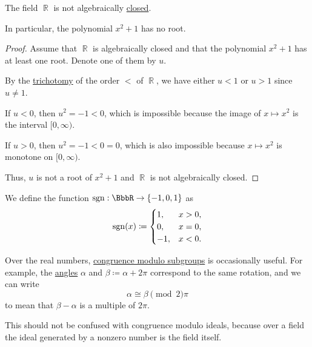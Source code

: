 \begin{proposition}\label{thm:reals_not_algebraically_closed}
  The field \( \BbbR \) is not algebraically \hyperref[def:algebraically_closed_field]{closed}.

  In particular, the polynomial \( x^2 + 1 \) has no root.
\end{proposition}
\begin{proof}
  Assume that \( \BbbR \) is algebraically closed and that the polynomial \( x^2 + 1 \) has at least one root. Denote one of them by \( u \).

  By the \hyperref[def:binary_relation/trichotomic]{trichotomy} of the order \( < \) of \( \BbbR \), we have either \( u < 1 \) or \( u > 1 \) since \( u \neq 1 \).

  If \( u < 0 \), then \( u^2 = -1 < 0 \), which is impossible because the image of \( x \mapsto x^2 \) is the interval \( [0, \infty) \).

  If \( u > 0 \), then \( u^2 = -1 < 0 = 0 \), which is also impossible because \( x \mapsto x^2 \) is monotone on \( [0, \infty) \).

  Thus, \( u \) is not a root of \( x^2 + 1 \) and \( \BbbR \) is not algebraically closed.
\end{proof}

\begin{definition}\label{def:signum}
  We define the  function \( \sgn: \BbbR \to \{ -1, 0, 1 \} \) as
  \begin{equation*}
    \operatorname{sgn}(x) \coloneqq \begin{cases}
      1,  & x > 0, \\
      0,  & x = 0, \\
      -1, & x < 0.
    \end{cases}
  \end{equation*}
\end{definition}

\begin{remark}\label{rem:congruence_modulo_real_number}
  Over the real numbers, \hyperref[def:congruence_modulo_normal_subgroup]{congruence modulo subgroups} is occasionally useful. For example, the \hyperref[def:angle]{angles} \( \alpha \) and \( \beta \coloneqq \alpha + 2\pi \) correspond to the same rotation, and we can write
  \begin{equation*}
    \alpha \cong \beta \pmod 2\pi
  \end{equation*}
  to mean that \( \beta - \alpha \) is a multiple of \( 2\pi \).

  This should not be confused with congruence modulo ideals, because over a field the ideal generated by a nonzero number is the field itself.
\end{remark}
